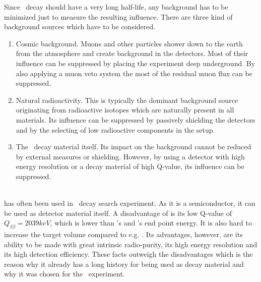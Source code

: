 \documentclass[encoding=utf8,british]{tumphthesis}
\begin{document}
Since \onbb\ decay should have a very long half-life, any background has to be minimized just to measure the resulting influence.
There are three kind of background sources which have to be considered.
\begin{enumerate}
    \item Cosmic background.
Muons and other particles shower down to the earth from the atmosphere and create background in the detectors.
Most of their influence can be suppressed by placing the experiment deep underground.
By also applying a muon veto system the most of the residual muon flux can be suppressed.
\item Natural radioactivity.
This is typically the dominant background source originating from radioactive isotopes which are naturally present in all materials.
Its influence can be suppressed by passively shielding the detectors and by the selecting of low radioactive components in the setup. 
\item The \twonu\ decay material itself.
Its impact on the background cannot be reduced by external measures or shielding.
However, by using a detector with high energy resolution or a decay material of high Q-value, its influence can be suppressed.
\end{enumerate}
\\

 has often been used in \onbb\ decay search experiment. 
As it is a semiconductor, it can be used as detector material itself.
A disadvantage of  is its low Q-value of $Q_{\beta\beta} = 2039\unit{keV}$, which is lower than 's and 's end point energy.
It is also hard to increase the target volume compared to e.g.  \cite{barabash_brief_2017}.
Its advantages, however, are its ability to be made with great intrinsic radio-purity, its high energy resolution and its high detection efficiency.
These facts outweigh the disadvantages which is the reason why it already has a long history for being used as decay material and why it was chosen for the \gerda\ experiment.
\\

\end{document}
